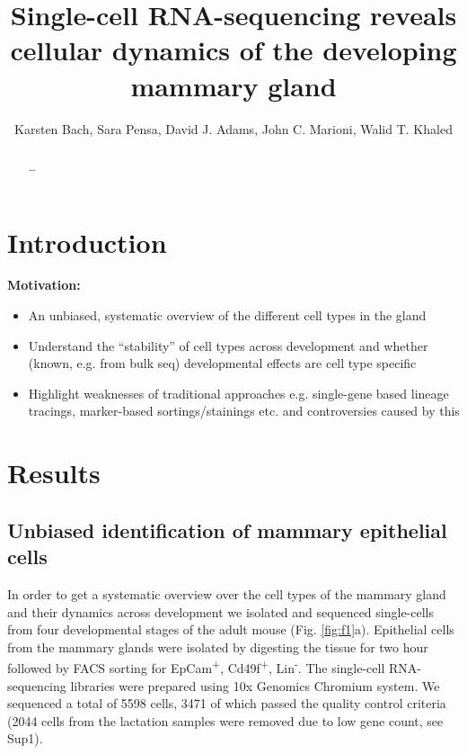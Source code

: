 \documentclass[oneside]{amsart}
\title{Single-cell RNA-sequencing reveals cellular dynamics of the developing mammary gland}
\author{Karsten Bach, Sara Pensa, David J. Adams, John C. Marioni, Walid T. Khaled}
\newcommand{\fref}[1]{Fig. \ref{#1}}
\begin{document}
\begin{abstract}
    \dots
\end{abstract}

\maketitle
\tableofcontents
\newpage
\section{Introduction}
\textbf{Motivation:}
\begin{itemize}
    \item An unbiased, systematic overview of the different cell types in the gland 
    \item Understand the ``stability'' of cell types across development and whether (known, e.g. from bulk seq) developmental effects are cell type specific
    \item Highlight weaknesses of traditional approaches e.g. single-gene based lineage tracings, marker-based sortings/stainings etc. and controversies caused by this
\end{itemize}
\section{Results}
\subsection{Unbiased identification of mammary epithelial cells\label{sec:cluster}}
In order to get a systematic overview over the cell types of the mammary gland and their dynamics across development we isolated and sequenced single-cells from four developmental stages of the adult mouse (\fref{fig:f1}a).
Epithelial cells from the mammary glands were isolated by digesting the tissue for two hour followed by FACS sorting for EpCam\textsuperscript{+}, Cd49f\textsuperscript{+}, Lin\textsuperscript{-}.
The single-cell RNA-sequencing libraries were prepared using 10x Genomics Chromium system.
We sequenced a total of 5598 cells, 3471 of which passed the quality control criteria (2044 cells from the lactation samples were removed due to low gene count, see Sup1).
\end{document}
